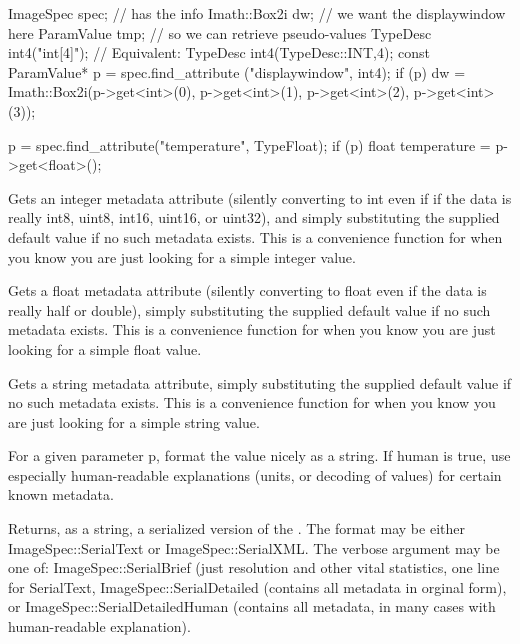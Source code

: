 \EXAMPLES
\begin{code}
    ImageSpec spec;           // has the info
    Imath::Box2i dw;          // we want the displaywindow here
    ParamValue tmp;           // so we can retrieve pseudo-values
    TypeDesc int4("int[4]");  // Equivalent: TypeDesc int4(TypeDesc::INT,4);
    const ParamValue* p = spec.find_attribute ("displaywindow", int4);
    if (p)
        dw = Imath::Box2i(p->get<int>(0), p->get<int>(1),
                          p->get<int>(2), p->get<int>(3));

    p = spec.find_attribute("temperature", TypeFloat);
    if (p)
        float temperature = p->get<float>();
\end{code}

\apiend

Gets an integer metadata attribute (silently converting to {\cf int}
even if if the data is really int8, uint8, int16, uint16, or uint32),
and simply substituting the supplied default value if no such metadata
exists.  This is a convenience function for when you know you are just
looking for a simple integer value.
\apiend

Gets a float metadata attribute (silently converting to {\cf float} even
if the data is really half or double), simply substituting the supplied
default value if no such metadata exists.  This is a convenience
function for when you know you are just looking for a simple float value.
\apiend

Gets a string metadata attribute, simply substituting the supplied
default value if no such metadata exists.  This is a convenience
function for when you know you are just looking for a simple string value.
\apiend


For a given parameter {\cf p}, format the value nicely as a string.
If {\cf human} is true, use
especially human-readable explanations (units, or decoding of
values) for certain known metadata.
\apiend


Returns, as a string, a serialized version of the \ImageSpec.
The {\cf format} may be either {\cf ImageSpec::SerialText} or
{\cf ImageSpec::SerialXML}.
The {\cf verbose} argument may be one of: {\cf ImageSpec::SerialBrief} (just
resolution and other vital statistics, one line for {\cf SerialText},
{\cf ImageSpec::SerialDetailed} (contains all metadata in orginal form), or
{\cf ImageSpec::SerialDetailedHuman} (contains all metadata, in many cases
with human-readable explanation).

